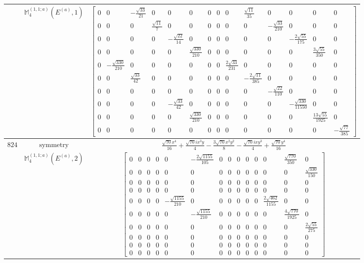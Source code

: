 \documentclass[fleqn,8pt,landscape]{jsarticle}
\begin{document}
\begin{longtable}{ccc}
$  $ & $ \mathbb{M}_{4}^{(1,1;a)}(E^{(a)},1) $ & $ \begin{bmatrix} 0 & 0 & - \frac{\sqrt{33}}{21} & 0 & 0 & 0 & 0 & 0 & 0 & \frac{\sqrt{11}}{35} & 0 & 0 & 0 & 0 \\ 0 & 0 & 0 & \frac{\sqrt{11}}{7} & 0 & 0 & 0 & 0 & 0 & 0 & - \frac{\sqrt{33}}{210} & 0 & 0 & 0 \\ 0 & 0 & 0 & 0 & - \frac{\sqrt{22}}{14} & 0 & 0 & 0 & 0 & 0 & 0 & - \frac{2 \sqrt{55}}{175} & 0 & 0 \\ 0 & 0 & 0 & 0 & 0 & \frac{\sqrt{330}}{210} & 0 & 0 & 0 & 0 & 0 & 0 & \frac{3 \sqrt{55}}{350} & 0 \\ 0 & - \frac{\sqrt{330}}{210} & 0 & 0 & 0 & 0 & 0 & 0 & \frac{2 \sqrt{33}}{231} & 0 & 0 & 0 & 0 & 0 \\ 0 & 0 & \frac{\sqrt{33}}{42} & 0 & 0 & 0 & 0 & 0 & 0 & - \frac{2 \sqrt{11}}{385} & 0 & 0 & 0 & 0 \\ 0 & 0 & 0 & 0 & 0 & 0 & 0 & 0 & 0 & 0 & - \frac{\sqrt{22}}{110} & 0 & 0 & 0 \\ 0 & 0 & 0 & 0 & - \frac{\sqrt{33}}{42} & 0 & 0 & 0 & 0 & 0 & 0 & - \frac{\sqrt{330}}{11550} & 0 & 0 \\ 0 & 0 & 0 & 0 & 0 & \frac{\sqrt{330}}{210} & 0 & 0 & 0 & 0 & 0 & 0 & \frac{13 \sqrt{55}}{1925} & 0 \\ 0 & 0 & 0 & 0 & 0 & 0 & 0 & 0 & 0 & 0 & 0 & 0 & 0 & - \frac{\sqrt{77}}{385} \end{bmatrix} $ \\ \hline
$ 824 $ & $ \text{symmetry} $ & $ \frac{\sqrt{70} x^{4}}{16} + \frac{\sqrt{70} i x^{3} y}{4} - \frac{3 \sqrt{70} x^{2} y^{2}}{8} - \frac{\sqrt{70} i x y^{3}}{4} + \frac{\sqrt{70} y^{4}}{16} $ \\
$  $ & $ \mathbb{M}_{4}^{(1,1;a)}(E^{(a)},2) $ & $ \begin{bmatrix} 0 & 0 & 0 & 0 & 0 & - \frac{2 \sqrt{1155}}{105} & 0 & 0 & 0 & 0 & 0 & 0 & \frac{\sqrt{770}}{350} & 0 \\ 0 & 0 & 0 & 0 & 0 & 0 & 0 & 0 & 0 & 0 & 0 & 0 & 0 & \frac{\sqrt{330}}{150} \\ 0 & 0 & 0 & 0 & 0 & 0 & 0 & 0 & 0 & 0 & 0 & 0 & 0 & 0 \\ 0 & 0 & 0 & 0 & 0 & 0 & 0 & 0 & 0 & 0 & 0 & 0 & 0 & 0 \\ 0 & 0 & 0 & 0 & - \frac{\sqrt{1155}}{210} & 0 & 0 & 0 & 0 & 0 & 0 & \frac{2 \sqrt{462}}{1155} & 0 & 0 \\ 0 & 0 & 0 & 0 & 0 & - \frac{\sqrt{1155}}{210} & 0 & 0 & 0 & 0 & 0 & 0 & \frac{4 \sqrt{770}}{1925} & 0 \\ 0 & 0 & 0 & 0 & 0 & 0 & 0 & 0 & 0 & 0 & 0 & 0 & 0 & \frac{2 \sqrt{55}}{275} \\ 0 & 0 & 0 & 0 & 0 & 0 & 0 & 0 & 0 & 0 & 0 & 0 & 0 & 0 \\ 0 & 0 & 0 & 0 & 0 & 0 & 0 & 0 & 0 & 0 & 0 & 0 & 0 & 0 \\ 0 & 0 & 0 & 0 & 0 & 0 & 0 & 0 & 0 & 0 & 0 & 0 & 0 & 0 \end{bmatrix} $ \\ \hline

\end{longtable}
\end{document}
